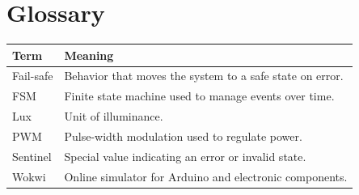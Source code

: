 \chapter{Glossary}

\begin{longtable}{@{}p{3.5cm}p{11cm}@{}}
\toprule
Term & Meaning \\
\midrule
Fail-safe & Behavior that moves the system to a safe state on error. \\
FSM & Finite state machine used to manage events over time. \\
Lux & Unit of illuminance. \\
PWM & Pulse-width modulation used to regulate power. \\
Sentinel & Special value indicating an error or invalid state. \\
Wokwi & Online simulator for Arduino and electronic components. \\
\bottomrule
\end{longtable}
